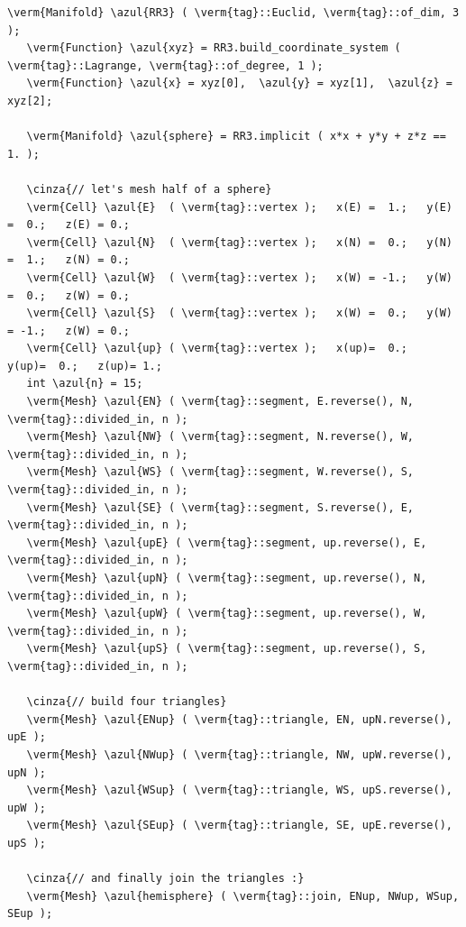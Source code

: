 \begin{Verbatim}[commandchars=\\\{\},formatcom=\small\tt,frame=single,
   label=parag-\ref{\numb section 2.\numb parag 5}.cpp,rulecolor=\color{coment},
   baselinestretch=0.94,framesep=2mm]
   \verm{Manifold} \azul{RR3} ( \verm{tag}::Euclid, \verm{tag}::of_dim, 3 );
   \verm{Function} \azul{xyz} = RR3.build_coordinate_system ( \verm{tag}::Lagrange, \verm{tag}::of_degree, 1 );
   \verm{Function} \azul{x} = xyz[0],  \azul{y} = xyz[1],  \azul{z} = xyz[2];

   \verm{Manifold} \azul{sphere} = RR3.implicit ( x*x + y*y + z*z == 1. );

   \cinza{// let's mesh half of a sphere}
   \verm{Cell} \azul{E}  ( \verm{tag}::vertex );   x(E) =  1.;   y(E) =  0.;   z(E) = 0.;
   \verm{Cell} \azul{N}  ( \verm{tag}::vertex );   x(N) =  0.;   y(N) =  1.;   z(N) = 0.;
   \verm{Cell} \azul{W}  ( \verm{tag}::vertex );   x(W) = -1.;   y(W) =  0.;   z(W) = 0.;
   \verm{Cell} \azul{S}  ( \verm{tag}::vertex );   x(W) =  0.;   y(W) = -1.;   z(W) = 0.;
   \verm{Cell} \azul{up} ( \verm{tag}::vertex );   x(up)=  0.;   y(up)=  0.;   z(up)= 1.;
   int \azul{n} = 15;
   \verm{Mesh} \azul{EN} ( \verm{tag}::segment, E.reverse(), N, \verm{tag}::divided_in, n );
   \verm{Mesh} \azul{NW} ( \verm{tag}::segment, N.reverse(), W, \verm{tag}::divided_in, n );
   \verm{Mesh} \azul{WS} ( \verm{tag}::segment, W.reverse(), S, \verm{tag}::divided_in, n );
   \verm{Mesh} \azul{SE} ( \verm{tag}::segment, S.reverse(), E, \verm{tag}::divided_in, n );
   \verm{Mesh} \azul{upE} ( \verm{tag}::segment, up.reverse(), E, \verm{tag}::divided_in, n );
   \verm{Mesh} \azul{upN} ( \verm{tag}::segment, up.reverse(), N, \verm{tag}::divided_in, n );
   \verm{Mesh} \azul{upW} ( \verm{tag}::segment, up.reverse(), W, \verm{tag}::divided_in, n );
   \verm{Mesh} \azul{upS} ( \verm{tag}::segment, up.reverse(), S, \verm{tag}::divided_in, n );

   \cinza{// build four triangles}
   \verm{Mesh} \azul{ENup} ( \verm{tag}::triangle, EN, upN.reverse(), upE );
   \verm{Mesh} \azul{NWup} ( \verm{tag}::triangle, NW, upW.reverse(), upN );
   \verm{Mesh} \azul{WSup} ( \verm{tag}::triangle, WS, upS.reverse(), upW );
   \verm{Mesh} \azul{SEup} ( \verm{tag}::triangle, SE, upE.reverse(), upS );

   \cinza{// and finally join the triangles :}
   \verm{Mesh} \azul{hemisphere} ( \verm{tag}::join, ENup, NWup, WSup, SEup );
\end{Verbatim}

